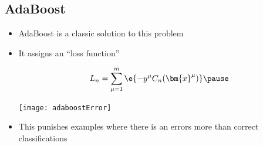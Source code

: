 
\begin{slide}
\section[-2]{AdaBoost}

\begin{PauseHighLight}
  \begin{itemize}
  \item AdaBoost is a classic solution to this problem\pause
  \item It assigns an ``loss function''\\
    \begin{minipage}{0.48\linewidth}
      \begin{align*}
        L_n = \sum_{\mu=1}^m \e{-y^\mu C_n(\bm{x}^\mu)}\pause
      \end{align*}
    \end{minipage}\hfil
    \begin{minipage}{0.48\linewidth}
      \texttt{[image: adaboostError]}
    \end{minipage}
  \item This punishes examples where there is an errors more than
    correct classifications\pause
  \end{itemize}
\end{PauseHighLight}

\end{slide}



